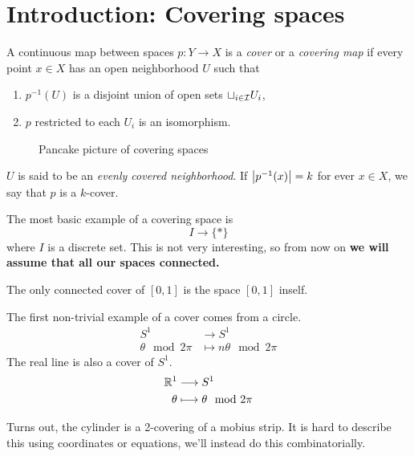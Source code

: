 \section{Introduction: Covering spaces}
A continuous map between spaces $p: Y \rightarrow X$ is a \emph{cover} or a \emph{covering map} if every point $x \in X$ has an open neighborhood $U$ such that \begin{enumerate}
  \item $p^{-1}(U)$ is a disjoint union of open sets $\sqcup_{i \in \mathcal{I}} U_i$,
  \item $p$ restricted to each $U_i$ is an isomorphism.
\end{enumerate}
\begin{figure}[H]
  \centering
  
  \caption{Pancake picture of covering spaces}
\end{figure}
$U$ is said to be an \emph{evenly covered neighborhood}.
If $\left\lvert p^{-1}(x) \right\rvert = k$ for ever $x \in X$, we say that $p$ is a $k$-cover.

\begin{ex}
  The most basic example of a covering space is
  \begin{equation*}
    I \rightarrow \{*\}
  \end{equation*}
  where $I$ is a discrete set.
  This is not very interesting, so from now on \textbf{we will assume that all our spaces connected.}
\end{ex}

\begin{ex}
  The only connected cover of $[0,1]$ is the space $[0,1]$ inself.
\end{ex}

\begin{ex}
  The first non-trivial example of a cover comes from a circle.
  \begin{align*}
    S^1 &\longrightarrow S^1 \\
    \theta \mod 2 \pi &\longmapsto n \theta \mod 2\pi
  \end{align*}
  The real line is also a cover of $S^1$.
  \begin{align*}
    \mathbb{R}^1 &\longrightarrow S^1 \\
    \theta &\longmapsto \theta \mod 2\pi
  \end{align*}
\end{ex}

\begin{ex}
  Turns out, the cylinder is a 2-covering of a mobius strip.
  It is hard to describe this using coordinates or equations, we'll instead do this combinatorially.
\end{ex}






